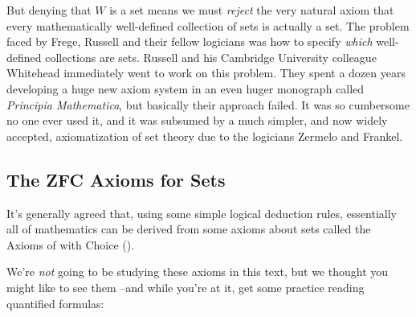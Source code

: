 But denying that $W$ is a set means we must \emph{reject} the very natural
axiom that every mathematically well-defined collection of sets is
actually a set.  The problem faced by Frege, Russell and their fellow
logicians was how to specify \emph{which} well-defined collections are
sets.  Russell and his Cambridge University colleague Whitehead
immediately went to work on this problem.  They spent a dozen years
developing a huge new axiom system in an even huger monograph called
\emph{Principia Mathematica}, but basically their approach failed.  It was
so cumbersome no one ever used it, and it was subsumed by a much simpler,
and now widely accepted, axiomatization of set theory due to the logicians
Zermelo and Frankel.

\subsection{The ZFC Axioms for Sets}
It's generally agreed that, using some simple logical deduction rules,
essentially all of mathematics can be derived from some axioms about sets
called the Axioms of  with Choice ().

We're \emph{not} going to be studying these axioms in this text, but we
thought you might like to see them --and while you're at it, get some
practice reading quantified formulas:

